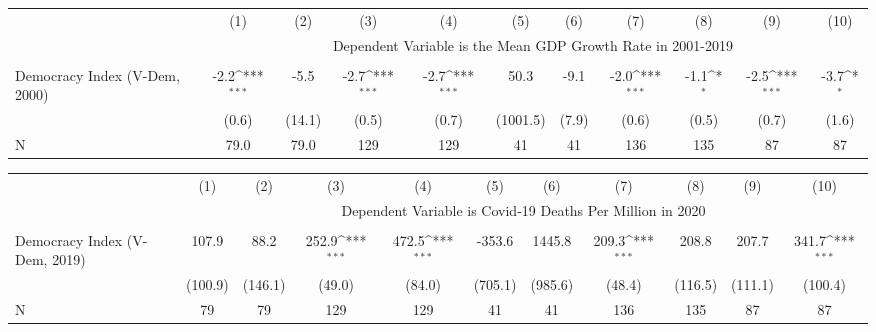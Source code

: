 {
\def\sym#1{\ifmmode^{#1}\else\(^{#1}\)\fi}
\begin{tabular}{l*{10}{c}}
\hline\hline
                    &\multicolumn{1}{c}{(1)}         &\multicolumn{1}{c}{(2)}         &\multicolumn{1}{c}{(3)}         &\multicolumn{1}{c}{(4)}         &\multicolumn{1}{c}{(5)}         &\multicolumn{1}{c}{(6)}         &\multicolumn{1}{c}{(7)}         &\multicolumn{1}{c}{(8)}         &\multicolumn{1}{c}{(9)}         &\multicolumn{1}{c}{(10)}         \\
&\multicolumn{10}{c}{ Dependent Variable is the Mean GDP Growth Rate in 2001-2019}\\\cline{2-11}\\[-1.8ex]
Democracy Index (V-Dem, 2000)&        -2.2\sym{***}&        -5.5         &        -2.7\sym{***}&        -2.7\sym{***}&        50.3         &        -9.1         &        -2.0\sym{***}&        -1.1\sym{*}  &        -2.5\sym{***}&        -3.7\sym{*}  \\
                    &       (0.6)         &      (14.1)         &       (0.5)         &       (0.7)         &    (1001.5)         &       (7.9)         &       (0.6)         &       (0.5)         &       (0.7)         &       (1.6)         \\
\hline
N                   &        79.0         &        79.0         &         129         &         129         &          41         &          41         &         136         &         135         &          87         &          87         \\
\hline\hline
\end{tabular}
}
{
\def\sym#1{\ifmmode^{#1}\else\(^{#1}\)\fi}
\begin{tabular}{l*{10}{c}}
\hline\hline
                    &\multicolumn{1}{c}{(1)}         &\multicolumn{1}{c}{(2)}         &\multicolumn{1}{c}{(3)}         &\multicolumn{1}{c}{(4)}         &\multicolumn{1}{c}{(5)}         &\multicolumn{1}{c}{(6)}         &\multicolumn{1}{c}{(7)}         &\multicolumn{1}{c}{(8)}         &\multicolumn{1}{c}{(9)}         &\multicolumn{1}{c}{(10)}         \\
&\multicolumn{10}{c}{ Dependent Variable is Covid-19 Deaths Per Million in 2020}\\\cline{2-11}\\[-1.8ex]
Democracy Index (V-Dem, 2019)&       107.9         &        88.2         &       252.9\sym{***}&       472.5\sym{***}&      -353.6         &      1445.8         &       209.3\sym{***}&       208.8         &       207.7         &       341.7\sym{***}\\
                    &     (100.9)         &     (146.1)         &      (49.0)         &      (84.0)         &     (705.1)         &     (985.6)         &      (48.4)         &     (116.5)         &     (111.1)         &     (100.4)         \\
\hline
N                   &          79         &          79         &         129         &         129         &          41         &          41         &         136         &         135         &          87         &          87         \\
\hline\hline
\end{tabular}
}

